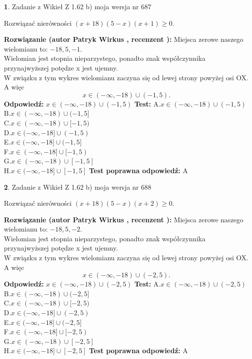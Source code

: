 \documentclass[12pt, a4paper]{article}
\theoremstyle{definition} %
\newtheorem{zad}{}
\newcommand{\zadStart}[1]{\begin{zad}#1\newline}
\newcommand{\zadStop}{\end{zad}}
\newcommand{\rozwStart}[2]{\noindent \textbf{Rozwiązanie (autor #1 , recenzent #2): }\newline}
\newcommand{\rozwStop}{\newline}
\newcommand{\odpStart}{\noindent \textbf{Odpowiedź:}\newline}
\newcommand{\odpStop}{\newline}
\newcommand{\testStart}{\noindent \textbf{Test:}\newline}
\newcommand{\testStop}{\newline}
\newcommand{\kluczStart}{\noindent \textbf{Test poprawna odpowiedź:}\newline}
\newcommand{\kluczStop}{\newline}
\begin{document}
\zadStart{Zadanie z Wikieł Z 1.62 b) moja wersja nr 687}

Rozwiązać nierówności $(x+18)(5-x)(x+1)\ge0$.
\zadStop
\rozwStart{Patryk Wirkus}{}
Miejsca zerowe naszego wielomianu to: $-18, 5, -1$.\\
Wielomian jest stopnia nieparzystego, ponadto znak współczynnika przy\linebreak najwyższej potędze x jest ujemny.\\ W związku z tym wykres wielomianu zaczyna się od lewej strony powyżej osi OX. A więc $$x \in (-\infty,-18) \cup (-1,5).$$
\rozwStop
\odpStart
$x \in (-\infty,-18) \cup (-1,5)$
\odpStop
\testStart
A.$x \in (-\infty,-18) \cup (-1,5)$\\
B.$x \in (-\infty,-18) \cup (-1,5]$\\
C.$x \in (-\infty,-18) \cup [-1,5)$\\
D.$x \in (-\infty,-18] \cup (-1,5)$\\
E.$x \in (-\infty,-18] \cup (-1,5]$\\
F.$x \in (-\infty,-18] \cup [-1,5)$\\
G.$x \in (-\infty,-18) \cup [-1,5]$\\
H.$x \in (-\infty,-18] \cup [-1,5]$
\testStop
\kluczStart
A
\kluczStop



\zadStart{Zadanie z Wikieł Z 1.62 b) moja wersja nr 688}

Rozwiązać nierówności $(x+18)(5-x)(x+2)\ge0$.
\zadStop
\rozwStart{Patryk Wirkus}{}
Miejsca zerowe naszego wielomianu to: $-18, 5, -2$.\\
Wielomian jest stopnia nieparzystego, ponadto znak współczynnika przy\linebreak najwyższej potędze x jest ujemny.\\ W związku z tym wykres wielomianu zaczyna się od lewej strony powyżej osi OX. A więc $$x \in (-\infty,-18) \cup (-2,5).$$
\rozwStop
\odpStart
$x \in (-\infty,-18) \cup (-2,5)$
\odpStop
\testStart
A.$x \in (-\infty,-18) \cup (-2,5)$\\
B.$x \in (-\infty,-18) \cup (-2,5]$\\
C.$x \in (-\infty,-18) \cup [-2,5)$\\
D.$x \in (-\infty,-18] \cup (-2,5)$\\
E.$x \in (-\infty,-18] \cup (-2,5]$\\
F.$x \in (-\infty,-18] \cup [-2,5)$\\
G.$x \in (-\infty,-18) \cup [-2,5]$\\
H.$x \in (-\infty,-18] \cup [-2,5]$
\testStop
\kluczStart
A
\kluczStop
\end{document}
